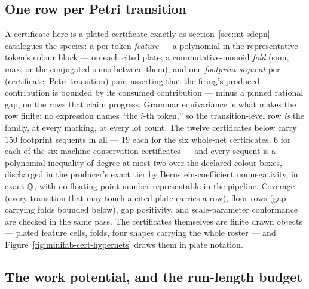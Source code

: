 \subsection{One row per Petri transition}
\label{sec:minifab-footprint}

A certificate here is a plated certificate exactly as
section~\ref{sec:mt-sdcpn} catalogues the species: a per-token
\emph{feature} --- a polynomial in the representative token's colour
block --- on each cited plate; a commutative-monoid \emph{fold}
(sum, max, or the conjugated sums between them); and one
\emph{footprint sequent} per (certificate, Petri transition) pair,
asserting that the firing's produced contribution is bounded by its
consumed contribution --- minus a pinned rational gap, on the rows
that claim progress. Grammar equivariance is what makes the row
finite: no expression names ``the $i$-th token,'' so the
transition-level row \emph{is} the family, at every marking, at
every lot count. The
twelve certificates below carry $150$ footprint sequents in all ---
$19$ each for the six whole-net certificates, $6$ for each of the
six machine-conservation certificates --- and every sequent is a
polynomial inequality of degree at most two over the declared colour
boxes, discharged in the producer's exact tier by
Bernstein-coefficient nonnegativity, in exact $\mathbb{Q}$, with no
floating-point number representable in the pipeline. Coverage (every
transition that may touch a cited plate carries a row), floor rows
(gap-carrying folds bounded below), gap positivity, and
scale-parameter conformance are checked in the same pass. The
certificates themselves are finite drawn objects --- plated feature
cells, folds, four shapes carrying the whole roster --- and
Figure~\ref{fig:minifab-cert-hypernets} draws them in plate
notation.

\subsection{The work potential, and the run-length budget}
\label{sec:minifab-ranking}

